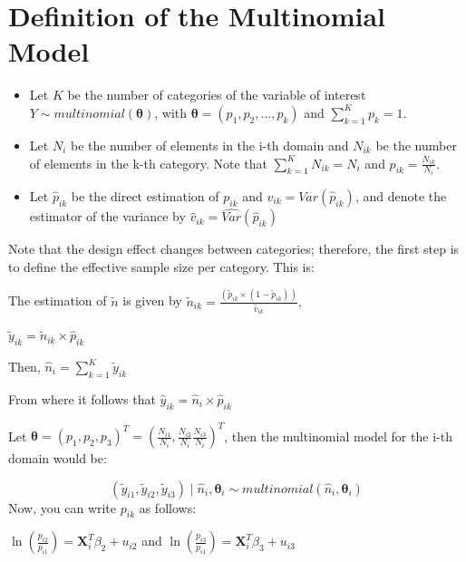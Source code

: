 \documentclass[
  12pt,
]{book}
\begin{document}
\hypertarget{definition-of-the-multinomial-model}{%
\section{Definition of the Multinomial Model}\label{definition-of-the-multinomial-model}}

\begin{itemize}
\item
  Let \(K\) be the number of categories of the variable of interest \(Y \sim multinomial\left(\boldsymbol{\theta}\right)\), with \(\boldsymbol{\theta}=\left(p_{1},p_{2},\dots ,p_{k}\right)\) and \(\sum_{k=1}^{K}p_{k}=1\).
\item
  Let \(N_i\) be the number of elements in the i-th domain and \(N_{ik}\) be the number of elements in the k-th category. Note that \(\sum_{k=1}^{K}N_{ik}=N_{i}\) and \(p_{ik}=\frac{N_{ik}}{N_{i}}\).
\item
  Let \(\hat{p}_{ik}\) be the direct estimation of \(p_{ik}\) and \(v_{ik}=Var\left(\hat{p}_{ik}\right)\), and denote the estimator of the variance by \(\hat{v}_{ik}=\widehat{Var}\left(\hat{p}_{ik}\right)\)
\end{itemize}

Note that the design effect changes between categories; therefore, the first step is to define the effective sample size per category. This is:

The estimation of \(\tilde{n}\) is given by \(\tilde{n}_{ik} = \frac{(\tilde{p}_{ik}\times(1-\tilde{p}_{ik}))}{\hat{v}_{ik}},\)

\(\tilde{y}_{ik}=\tilde{n}_{ik}\times\hat{p}_{ik}\)

Then, \(\hat{n}_{i} = \sum_{k=1}^{K}\tilde{y}_{ik}\)

From where it follows that \(\hat{y}_{ik} = \hat{n}_i\times \hat{p}_{ik}\)

Let \(\boldsymbol{\theta}=\left(p_{1},p_{2}, p_{3}\right)^{T}=\left(\frac{N_{i1}}{N_{i}},\frac{N_{i2}}{N_{i}}\frac{N_{i3}}{N_{i}}\right)^{T}\), then the multinomial model for the i-th domain would be:

\[
\left(\tilde{y}_{i1},\tilde{y}_{i2},\tilde{y}_{i3}\right)\mid\hat{n}_{i},\boldsymbol{\theta}_{i}\sim multinomial\left(\hat{n}_{i},\boldsymbol{\theta}_{i}\right)
\]
Now, you can write \(p_{ik}\) as follows:

\(\ln\left(\frac{p_{i2}}{p_{i1}}\right)=\boldsymbol{X}_{i}^{T}\beta_{2} + u_{i2}\) and
\(\ln\left(\frac{p_{i3}}{p_{i1}}\right)=\boldsymbol{X}_{i}^{T}\beta_{3}+ u_{i3}\)
\end{document}
